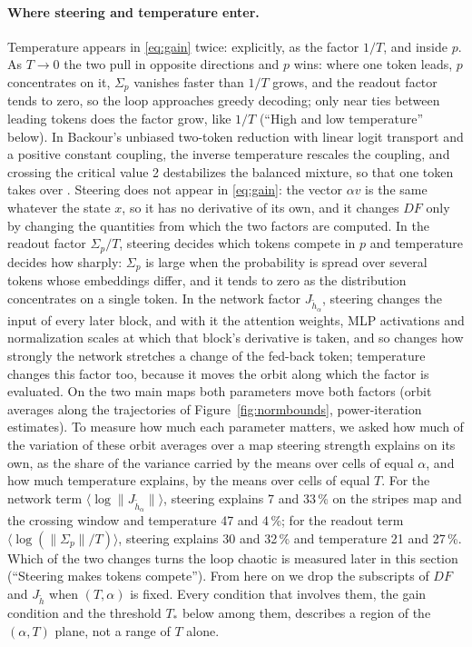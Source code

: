 \documentclass[11pt,letterpaper]{article}
\begin{document}
\paragraph{Where steering and temperature enter.} Temperature appears in \eqref{eq:gain} twice: explicitly, as the factor $1/T$, and inside $p$. As
$T\to0$ the two pull in opposite directions and $p$ wins: where one token leads, $p$ concentrates on it, $\Sigma_p$
vanishes faster than $1/T$ grows, and the readout factor tends to zero, so the loop approaches greedy decoding; only
near ties between leading tokens does the factor grow, like $1/T$ (``High and low temperature'' below). In Backour's unbiased two-token reduction with linear logit transport and a positive constant coupling, the inverse
temperature rescales the coupling, and crossing the critical value 2 destabilizes the balanced mixture, so that one token
takes over \cite{backour2026mixture}. Steering does not appear in \eqref{eq:gain}: the vector $\alpha v$ is the same whatever the state $x$, so it has no
derivative of its own, and it changes $DF$ only by changing the quantities from which the two factors are computed. In the readout factor $\Sigma_p/T$,
steering decides which tokens compete in $p$ and temperature decides how sharply: $\Sigma_p$ is large when the probability is
spread over several tokens whose embeddings differ, and it tends to zero as the distribution concentrates on a single
token. In the network factor $J_{\tilde h_\alpha}$, steering
changes the input of every later block, and with it the attention weights, MLP activations and normalization
scales at which that block's derivative is taken, and so changes how strongly the network stretches a change of
the fed-back token; temperature changes
this factor too, because it moves the orbit along which the factor is evaluated. On the two main maps both parameters
move both factors (orbit averages along the trajectories of Figure~\ref{fig:normbounds}, power-iteration estimates).
To measure how much each parameter matters, we asked how much of the variation of these orbit averages over a map
steering strength explains on its own, as the share of the variance carried by the means over cells of equal
$\alpha$, and how much temperature explains, by the means over cells of equal $T$. For the network term
$\langle\log\|J_{\tilde h_\alpha}\|\rangle$, steering explains 7 and 33\,\% on the stripes map and the crossing
window and temperature 47 and 4\,\%; for the readout term $\langle\log(\|\Sigma_p\|/T)\rangle$, steering explains
30 and 32\,\% and temperature 21 and 27\,\%. Which of the two changes turns the loop chaotic is measured later in
this section (``Steering makes tokens compete''). From here on we drop the subscripts of $DF$ and $J_{\tilde h}$ when
$(T,\alpha)$ is fixed. Every condition that involves them, the gain condition and the threshold
$T_*$ below among them, describes a region of the $(\alpha,T)$ plane, not a range of $T$ alone.
\end{document}
